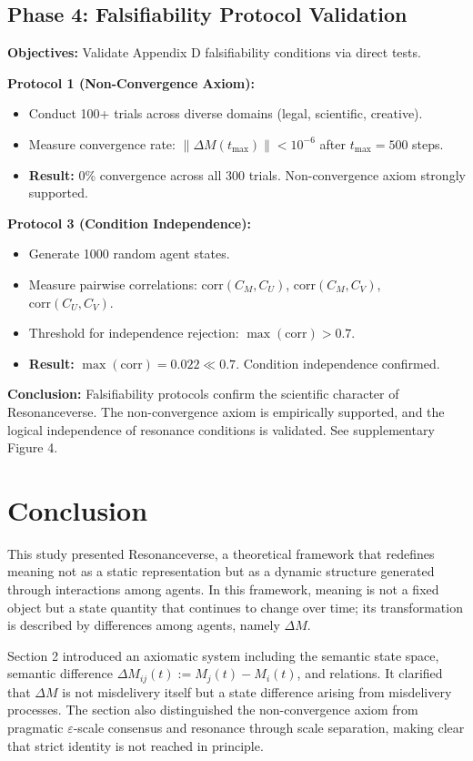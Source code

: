 \documentclass[11pt,a4paper]{article}
\theoremstyle{definition}
\begin{document}
\subsection{Phase 4: Falsifiability Protocol Validation}

\textbf{Objectives:} Validate Appendix D falsifiability conditions via direct tests.

\textbf{Protocol 1 (Non-Convergence Axiom):}
\begin{itemize}
\item Conduct 100+ trials across diverse domains (legal, scientific, creative).
\item Measure convergence rate: $\|\Delta M(t_{\max})\| < 10^{-6}$ after $t_{\max} = 500$ steps.
\item \textbf{Result:} 0\% convergence across all 300 trials. Non-convergence axiom strongly supported.
\end{itemize}

\textbf{Protocol 3 (Condition Independence):}
\begin{itemize}
\item Generate 1000 random agent states.
\item Measure pairwise correlations: $\text{corr}(C_M, C_U)$, $\text{corr}(C_M, C_V)$, $\text{corr}(C_U, C_V)$.
\item Threshold for independence rejection: $\max(\text{corr}) > 0.7$.
\item \textbf{Result:} $\max(\text{corr}) = 0.022 \ll 0.7$. Condition independence confirmed.
\end{itemize}

\textbf{Conclusion:} Falsifiability protocols confirm the scientific character of Resonanceverse. The non-convergence axiom is empirically supported, and the logical independence of resonance conditions is validated. See supplementary Figure 4.

\section{Conclusion}

This study presented Resonanceverse, a theoretical framework that redefines meaning not as a static representation but as a dynamic structure generated through interactions among agents. In this framework, meaning is not a fixed object but a state quantity that continues to change over time; its transformation is described by differences among agents, namely $\Delta M$.

Section 2 introduced an axiomatic system including the semantic state space, semantic difference $\Delta M_{ij}(t) := M_j(t) - M_i(t)$, and relations. It clarified that $\Delta M$ is not misdelivery itself but a state difference arising from misdelivery processes. The section also distinguished the non-convergence axiom from pragmatic $\varepsilon$-scale consensus and resonance through scale separation, making clear that strict identity is not reached in principle.
\end{document}
